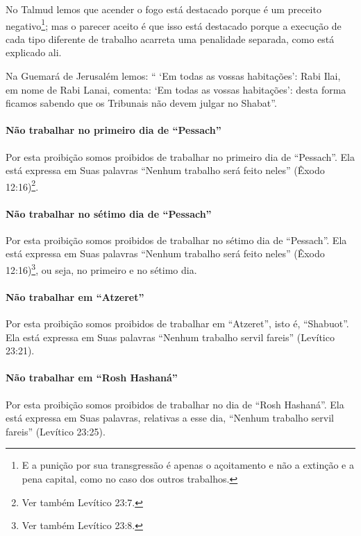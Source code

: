 No Talmud lemos que acender o fogo está destacado porque é um preceito
negativo\footnote{E a punição por sua transgressão é apenas o açoitamento e não a
  extinção e a pena capital, como no caso dos outros trabalhos.}; mas o parecer aceito é que isso está
destacado porque a execução de cada tipo diferente de trabalho acarreta
uma penalidade separada, como está explicado ali.

Na Guemará de Jerusalém lemos: `` `Em todas as vossas habitações': Rabi
Ilai, em nome de Rabi Lanai, comenta: `Em todas as vossas habitações':
desta forma ficamos sabendo que os Tribunais não devem julgar no
Shabat''.

\paragraph{Não trabalhar no primeiro dia de ``Pessach''}

Por esta proibição somos proibidos de trabalhar no primeiro dia de
``Pessach''. Ela está expressa em Suas palavras ``Nenhum trabalho será
feito neles'' (Êxodo 12:16)\footnote{Ver também Levítico 23:7.}.

\paragraph{Não trabalhar no sétimo dia de ``Pessach''}

Por esta proibição somos proibidos de trabalhar no sétimo dia de
``Pessach''. Ela está expressa em Suas palavras ``Nenhum trabalho será
feito neles'' (Êxodo 12:16)\footnote{Ver também Levítico 23:8.}, ou seja, no primeiro
e no sétimo dia.

\paragraph{Não trabalhar em ``Atzeret''}

Por esta proibição somos proibidos de trabalhar em ``Atzeret'', isto é,
``Shabuot''. Ela está expressa em Suas palavras ``Nenhum trabalho servil
fareis'' (Levítico 23:21).

\paragraph{Não trabalhar em ``Rosh Hashaná''}

Por esta proibição somos proibidos de trabalhar no dia de ``Rosh
Hashaná''. Ela está expressa em Suas palavras, relativas a esse dia,
``Nenhum trabalho servil fareis'' (Levítico 23:25).

